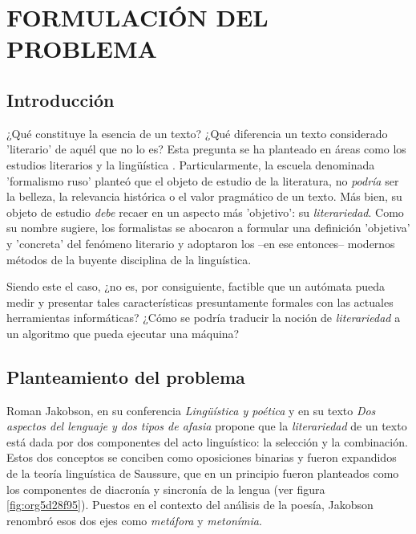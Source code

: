 \documentclass[12pt,letterpaper,twoside]{article}
\begin{document}
\section{FORMULACIÓN DEL PROBLEMA}
\label{sec:org93c093b}
\subsection{Introducción}
\label{sec:org7defe06}

¿Qué constituye la esencia de un texto? ¿Qué diferencia un texto
considerado 'literario' de aquél que no lo es? Esta pregunta se ha
planteado en áreas como los estudios literarios y la lingüística
\cite{eijembaum2010teoria}. Particularmente, la escuela denominada
'formalismo ruso' planteó que el objeto de estudio de la literatura,
no \emph{podría} ser la belleza, la relevancia histórica o el valor
pragmático de un texto. Más bien, su objeto de estudio \emph{debe} recaer
en un aspecto más 'objetivo': su \emph{literariedad}.  Como su nombre
sugiere, los formalistas se abocaron a formular una definición
'objetiva' y 'concreta' del fenómeno literario y adoptaron los --en
ese entonces-- modernos métodos de la buyente disciplina de la
linguística.

Siendo este el caso, ¿no es, por consiguiente, factible que un
autómata pueda medir y presentar tales características presuntamente
formales con las actuales herramientas informáticas? ¿Cómo se podría
traducir la noción de \emph{literariedad} a un algoritmo que pueda ejecutar
una máquina?


\subsection{Planteamiento del problema}
\label{sec:orga5ee905}

Roman Jakobson, en su conferencia \emph{Lingüística y poética}
\cite{jakobson1981linguistica} y en su texto \emph{Dos aspectos del lenguaje y dos
tipos de afasia} \cite{jakobson1956two} propone que la
\emph{literariedad} de un texto está dada por dos componentes del acto
linguístico: la selección y la combinación. Estos dos conceptos se
conciben como oposiciones binarias y fueron expandidos de la
teoría linguística de Saussure, que en un principio fueron
planteados como los componentes de diacronía y sincronía de la
lengua (ver figura \ref{fig:org5d28f95}). Puestos en el contexto del
análisis de la poesía, Jakobson renombró esos dos ejes como
\emph{metáfora} y \emph{metonímia}.
\end{document}
